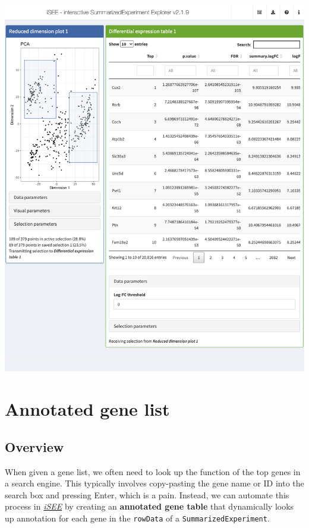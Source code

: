 \documentclass[
]{book}
\begin{document}
\includegraphics[width=1\linewidth]{screenshots/de-table}

\hypertarget{annotated-gene-list}{%
\chapter{Annotated gene list}\label{annotated-gene-list}}

\hypertarget{overview}{%
\section{Overview}\label{overview}}

When given a gene list, we often need to look up the function of the top genes in a search engine.
This typically involves copy-pasting the gene name or ID into the search box and pressing Enter, which is a pain.
Instead, we can automate this process in \emph{\href{https://bioconductor.org/packages/3.11/iSEE}{iSEE}} by creating an \textbf{annotated gene table} that dynamically looks up annotation for each gene in the \texttt{rowData} of a \texttt{SummarizedExperiment}.
\end{document}
